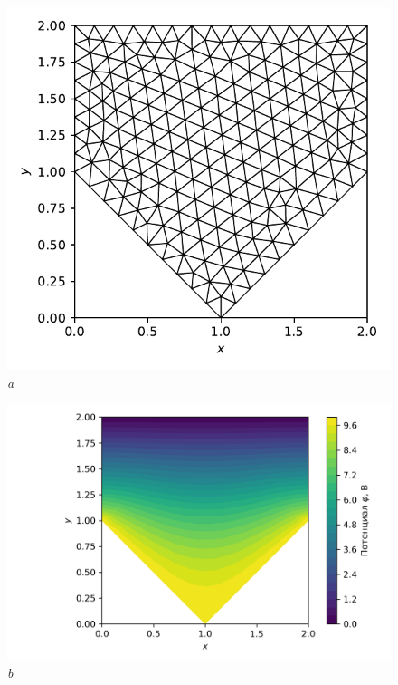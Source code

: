 \documentclass[12pt, a4paper]{article}
\begin{document}
			\begin{figure}[h]       
				\begin{center} 
					{ 
						\begin{minipage}{0.47\textwidth} 
							\centering 
							\hspace*{-9.5mm}
							\includegraphics[width=0.99\columnwidth]{Test_domain_4_mesh001_calfem_net.pdf}\\
							\textit{a} 
						\end{minipage}                                 
					} 
					{ 
						\begin{minipage}{0.47\textwidth} 
							\centering 
							\hspace*{-17.5mm}
							\includegraphics[width=1.4\columnwidth]{Test_domain_4_mesh001_calfem.png}\\
							\textit{b} 
						\end{minipage}                                 
					} 
					

\end{center}
\end{figure}
\end{document}
